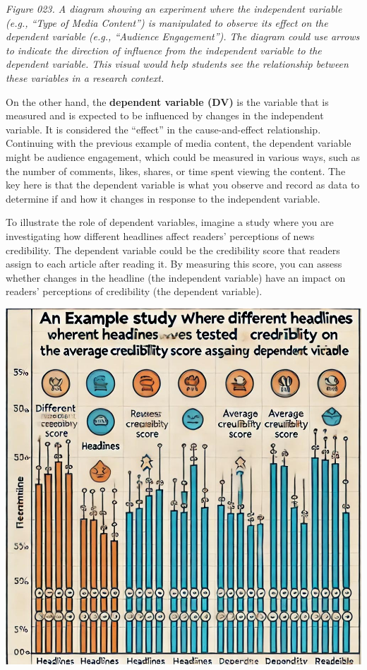 \documentclass[
]{book}
\begin{document}
\emph{Figure 023. A diagram showing an experiment where the independent variable (e.g., ``Type of Media Content'') is manipulated to observe its effect on the dependent variable (e.g., ``Audience Engagement''). The diagram could use arrows to indicate the direction of influence from the independent variable to the dependent variable. This visual would help students see the relationship between these variables in a research context.}

On the other hand, the \textbf{dependent variable (DV)} is the variable that is measured and is expected to be influenced by changes in the independent variable. It is considered the ``effect'' in the cause-and-effect relationship. Continuing with the previous example of media content, the dependent variable might be audience engagement, which could be measured in various ways, such as the number of comments, likes, shares, or time spent viewing the content. The key here is that the dependent variable is what you observe and record as data to determine if and how it changes in response to the independent variable.

To illustrate the role of dependent variables, imagine a study where you are investigating how different headlines affect readers' perceptions of news credibility. The dependent variable could be the credibility score that readers assign to each article after reading it. By measuring this score, you can assess whether changes in the headline (the independent variable) have an impact on readers' perceptions of credibility (the dependent variable).

\includegraphics[width=1\linewidth,height=\textheight,keepaspectratio]{images/fig024.jpg}
\end{document}
